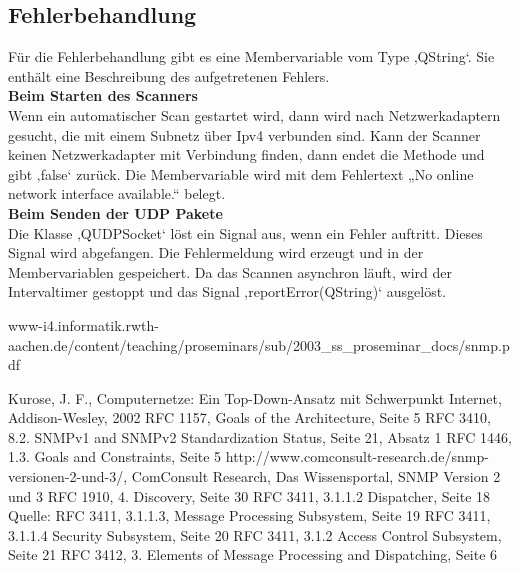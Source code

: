 \documentclass[11pt,a4paper]{article}
\begin{document}
\subsection{Fehlerbehandlung}
Für die Fehlerbehandlung gibt es eine Membervariable vom Type ‚QString‘. Sie enthält eine Beschreibung des aufgetretenen Fehlers.\\
\textbf{Beim Starten des Scanners}\\
Wenn ein automatischer Scan gestartet wird, dann wird nach Netzwerkadaptern gesucht, die mit einem Subnetz über Ipv4 verbunden sind. Kann der 	Scanner keinen Netzwerkadapter mit Verbindung finden, dann endet die Methode und gibt ‚false‘ zurück. Die Membervariable wird mit dem 						Fehlertext „No online network interface available.“ belegt.\\
\textbf{Beim Senden der UDP Pakete}\\
Die Klasse ‚QUDPSocket‘ löst ein Signal aus, wenn ein Fehler auftritt. Dieses Signal wird abgefangen. Die Fehlermeldung wird erzeugt und in der 				Membervariablen gespeichert. Da das Scannen asynchron läuft, wird der Intervaltimer gestoppt und das Signal ‚reportError(QString)‘ ausgelöst.

\newpage
\begin{thebibliography}{10}
	\begin{small}
		www-i4.informatik.rwth-aachen.de/content/teaching/proseminars/sub/2003\_ss\_proseminar\_docs/snmp.pdf
	\end{small}
		Kurose, J. F.,
		Computernetze: Ein Top-Down-Ansatz mit Schwerpunkt Internet,
		Addison-Wesley,
		2002
		RFC 1157, Goals of the Architecture, Seite 5
		RFC 3410, 8.2.  SNMPv1 and SNMPv2 Standardization Status, Seite 21, Absatz 1
		RFC 1446, 1.3.  Goals and Constraints, Seite 5
		http://www.comconsult-research.de/snmp-versionen-2-und-3/,
		ComConsult Research, Das Wissensportal, SNMP Version 2 und 3
		RFC 1910, 4. Discovery, Seite 30
		RFC 3411,  3.1.1.2 Dispatcher, Seite 18
		Quelle: RFC 3411, 3.1.1.3, Message Processing Subsystem, Seite 19
		RFC 3411, 3.1.1.4 Security Subsystem, Seite 20
		RFC 3411, 3.1.2  Access Control Subsystem, Seite 21
		RFC 3412, 3. Elements of Message Processing and Dispatching, Seite 6
\end{thebibliography}
\end{document}
